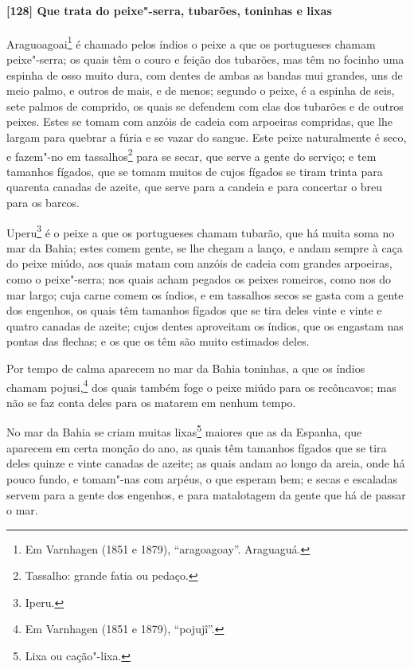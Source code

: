 \paragraph{[128] Que trata do peixe"-serra, tubarões, toninhas e lixas}\quad
Araguoagoai\footnote{ Em Varnhagen (1851 e 1879), ``aragoagoay''. Araguaguá.} é chamado
pelos índios o peixe a que os portugueses chamam peixe"-serra; os quais têm o couro e
feição dos tubarões, mas têm no focinho uma espinha de osso muito dura, com dentes de
ambas as bandas mui grandes, uns de meio palmo, e outros de mais, e de menos; segundo o
peixe, é a espinha de seis, sete palmos de comprido, os quais se defendem com elas dos
tubarões e de outros peixes. Estes se tomam com anzóis de cadeia com arpoeiras compridas,
que lhe largam para quebrar a fúria e se vazar do sangue. Este peixe naturalmente é seco,
e fazem"-no em tassalhos\footnote{ Tassalho: grande fatia ou pedaço.} para se secar, que
serve a gente do serviço; e tem tamanhos fígados, que se tomam muitos de cujos
fígados se tiram trinta para quarenta canadas de azeite, que serve para a candeia e para
concertar o breu para os barcos.

Uperu\footnote{ Iperu.} é o peixe a que os portugueses chamam tubarão, que há muita soma
no mar da Bahia; estes comem gente, se lhe chegam a lanço, e andam sempre à caça do peixe
miúdo, aos quais matam com anzóis de cadeia com grandes arpoeiras, como o peixe"-serra; nos
quais acham pegados os peixes romeiros, como nos do mar largo; cuja carne comem os índios,
e em tassalhos secos se gasta com a gente dos engenhos, os quais têm tamanhos fígados que
se tira deles vinte e vinte e quatro canadas de azeite; cujos dentes aproveitam os índios,
que os engastam nas pontas das flechas; e os que os têm são muito estimados deles.

Por tempo de calma aparecem no mar da Bahia toninhas, a que os índios chamam
pojusi,\footnote{ Em Varnhagen (1851 e 1879), ``pojujî''.} dos quais também foge o peixe
miúdo para os recôncavos; mas não se faz conta deles para os matarem em nenhum tempo.

No mar da Bahia se criam muitas lixas\footnote{ Lixa ou cação"-lixa.} maiores que as da
Espanha, que aparecem em certa monção do ano, as quais têm tamanhos fígados que se tira
deles quinze e vinte canadas de azeite; as quais andam ao longo da areia, onde há pouco
fundo, e tomam"-nas com arpéus, o que esperam bem; e secas e escaladas servem para a gente
dos engenhos, e para matalotagem da gente que há de passar o mar.

